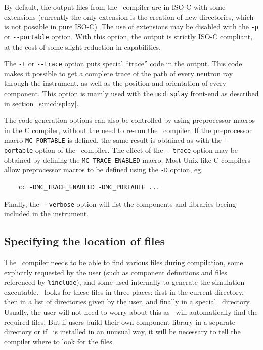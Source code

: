 By default, the output files from the \MCS\ compiler are in ISO-C with
some extensions (currently the only extension is the creation of new
directories, which is not possible in pure ISO-C). The use of
extensions may be disabled with the \verb+-p+ or \verb+--portable+
option. With this option, the output is strictly ISO-C compliant, at
the cost of some slight reduction in capabilities.

The \verb+-t+ or \verb+--trace+ option puts special ``trace'' code in
the output. This code makes it possible to get a complete trace of the
path of every neutron ray through the instrument, as well as the position
and orientation of every component. This option is mainly used with the
\verb+mcdisplay+ front-end as described in section~\ref{s:mcdisplay}.

The code generation options can also be controlled by using preprocessor
macros in the C compiler, without the need to re-run the \MCS\
compiler. If the preprocessor macro \verb+MC_PORTABLE+ is defined, the
same result is obtained as with the \verb+--portable+ option of the
\MCS\ compiler. The effect of the \verb+--trace+ option may be obtained
by defining the \verb+MC_TRACE_ENABLED+ macro. Most Unix-like C
compilers allow preprocessor macros to be defined using the \verb+-D+
option, eg.
\begin{verbatim}
    cc -DMC_TRACE_ENABLED -DMC_PORTABLE ...
\end{verbatim}
Finally, the \verb+--verbose+ option will list the components and libraries beeing
included in the instrument.

\subsection{Specifying the location of files}
\label{s:files}

The \MCS\ compiler needs to be able to find various files during
compilation, some explicitly requested by the user (such as component
definitions and files referenced by \verb+%include+), 
and some used internally to generate the simulation executable. \MCS\ looks for these
files in three places: first in the current directory, then in a list of
directories given by the user, and finally in a special \MCS\
directory. Usually, the user will not need to worry about this as \MCS\
will automatically find the required files. But if users build their own
component library in a separate directory or if \MCS\ is installed in an
unusual way, it will be necessary to tell the compiler where to look
for the files.

